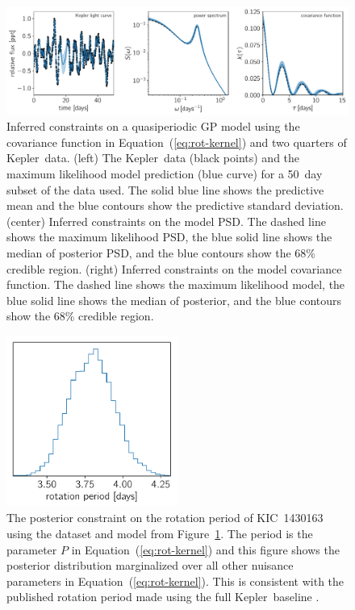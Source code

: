 \documentclass[manuscript, letterpaper]{aastex6}
\newcommand{\project}[1]{\textsf{#1}}
\newcommand{\kepler}{\project{Kepler}}
\newcommand{\figureref}[1]{\ref{fig:#1}}
\newcommand{\Figure}[1]{Figure~\figureref{#1}}
\newcommand{\figurelabel}[1]{\label{fig:#1}}
\renewcommand{\eqref}[1]{\ref{eq:#1}}
\newcommand{\Eq}[1]{Equation~(\eqref{#1})}
\newcommand{\eq}[1]{\Eq{#1}}
\begin{document}
\begin{figure}[!htbp]
\begin{center}
\includegraphics[width=\textwidth]{figures/rotation.pdf}
\caption{Inferred constraints on a quasiperiodic GP model using the covariance
    function in \eq{rot-kernel} and two quarters of \kepler\ data.
(left) The \kepler\ data (black points) and the maximum likelihood model
    prediction (blue curve) for a 50~day subset of the data used.
    The solid blue line shows the predictive mean and the blue contours show
    the predictive standard deviation.
(center) Inferred constraints on the model PSD.
    The dashed line shows the maximum likelihood PSD, the blue solid line
    shows the median of posterior PSD, and the blue contours show the 68\%
    credible region.
(right) Inferred constraints on the model covariance function.
    The dashed line shows the maximum likelihood model, the blue solid line
    shows the median of posterior, and the blue contours show the 68\%
    credible region.
    \figurelabel{rotation}}
\end{center}
\end{figure}

\begin{figure}[!htbp]
\begin{center}
\includegraphics[width=0.5\textwidth]{figures/rotation-period.pdf}
\caption{The posterior constraint on the rotation period of KIC~1430163 using
    the dataset and model from \Figure{rotation}.
    The period is the parameter $P$ in \eq{rot-kernel} and this figure shows
    the posterior distribution marginalized over all other nuisance parameters
    in \eq{rot-kernel}.
    This is consistent with the published rotation period made using the full
    \kepler\ baseline \citep{Mathur:2014}.
    \figurelabel{rotation-period}}
\end{center}
\end{figure}
\end{document}
